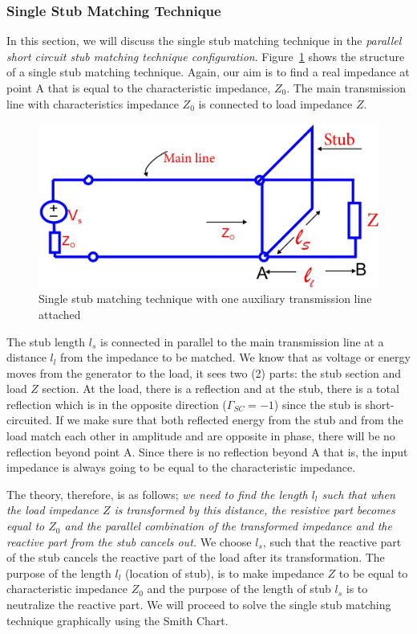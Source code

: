 \subsubsection{Single Stub Matching Technique}
In this section, we will discuss the single stub matching technique in the \textit{parallel short circuit stub matching technique configuration}. Figure~\ref{fig:fig11} shows the structure of a single stub matching technique. Again, our aim is to find a real impedance at point A that is equal to the characteristic impedance, $Z_0$. The main transmission line with characteristics impedance $ Z_0$ is connected to load impedance $Z$.
\begin{figure}[h]
\centering
\includegraphics[width=1\linewidth]{./graphics/fig11}
\caption{Single stub matching technique with one auxiliary transmission line attached}
\label{fig:fig11}
\end{figure}

The stub length $l_s$ is connected in parallel to the main transmission line at a distance $ l_l$ from the impedance to be matched. We know that as voltage or energy moves from the generator to the load, it sees two (2) parts: the stub section and load $Z$ section. At the load, there is a reflection and at the stub, there is a total reflection which is in the opposite direction ($\Gamma_{SC} = -1$) since the stub is short-circuited. If we make sure that both reflected energy from the stub and from the load match each other in amplitude and are opposite in phase, there will be no reflection beyond point A. Since there is no reflection beyond A that is, the input impedance is always going to be equal to the characteristic impedance.

The theory, therefore, is as follows; \emph{we need to find the length $ l_l$ such that when the load impedance $Z$ is transformed by this distance, the resistive part becomes equal to $Z_0$ and the parallel combination of the transformed impedance and the reactive part from the stub cancels out.} We choose $l_s$, such that the reactive part of the stub cancels the reactive part of the load after its transformation. The purpose of the length $l_l$ (location of stub), is to make impedance $Z$ to be equal to characteristic impedance $Z_0$ and the purpose of the length of stub $l_s$ is to neutralize the reactive part. We will proceed to solve the single stub matching technique graphically using the Smith Chart.

